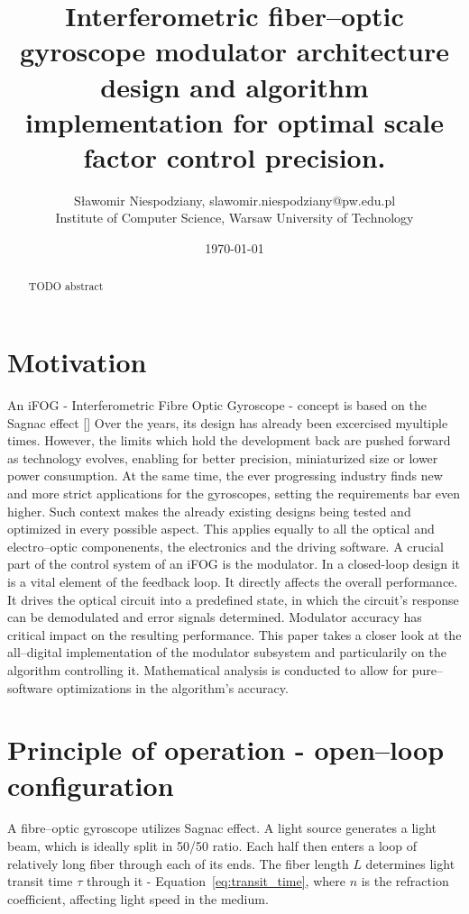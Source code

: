 \documentclass{article}
\title{Interferometric fiber--optic gyroscope modulator architecture design and algorithm implementation for optimal scale factor control precision.}
\author{Sławomir Niespodziany, slawomir.niespodziany@pw.edu.pl \\
    Institute of Computer Science, Warsaw University of Technology}
\date{\today}
\begin{document}
\maketitle


\begin{abstract}
    TODO abstract
\end{abstract}


\section{Motivation}
An iFOG - Interferometric Fibre Optic Gyroscope - concept is based on the Sagnac effect
    [] %
Over the years, its design has already been excercised myultiple times. However, the limits which hold the development back are pushed forward as technology evolves, enabling for better precision, miniaturized size or lower power consumption. At the same time, the ever progressing industry finds new and more strict applications for the gyroscopes, setting the requirements bar even higher. Such context makes the already existing designs being tested and optimized in every possible aspect. This applies equally to all the optical and electro--optic componenents, the electronics and the driving software. A crucial part of the control system of an iFOG is the modulator. In a closed-loop design it is a vital element of the feedback loop. It directly affects the overall performance. It drives the optical circuit into a predefined state, in which the circuit's response can be demodulated and error signals determined. Modulator accuracy has critical impact on the resulting performance. This paper takes a closer look at the all--digital implementation of the modulator subsystem and particularily on the algorithm controlling it. Mathematical analysis is conducted to allow for pure--software optimizations in the algorithm's accuracy.

\section{Principle of operation - open--loop configuration}
A fibre--optic gyroscope utilizes Sagnac effect. A light source generates a light beam, which is ideally split in 50/50 ratio. Each half then enters a loop of relatively long fiber through each of its ends. The fiber length $L$ determines light transit time $\tau$ through it - Equation~\ref{eq:transit_time}, where $n$ is the refraction coefficient, affecting light speed in the medium.
\end{document}
